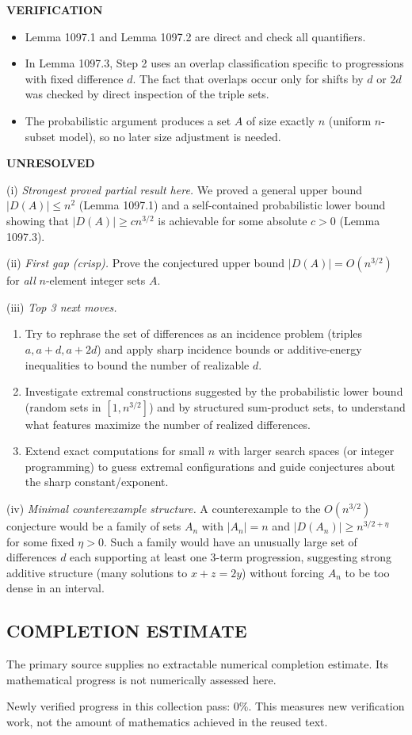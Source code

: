 \medskip
\noindent\textbf{VERIFICATION}

\smallskip
\noindent
\begin{itemize}
\item Lemma 1097.1 and Lemma 1097.2 are direct and check all quantifiers.
\item In Lemma 1097.3, Step 2 uses an overlap classification specific to progressions with fixed difference $d$. The fact that overlaps occur only for shifts by $d$ or $2d$ was checked by direct inspection of the triple sets.
\item The probabilistic argument produces a set $A$ of size exactly $n$ (uniform $n$-subset model), so no later size adjustment is needed.
\end{itemize}

\medskip
\noindent\textbf{UNRESOLVED}

\smallskip
\noindent
(i) \emph{Strongest proved partial result here.}
We proved a general upper bound $|D(A)|\le n^2$ (Lemma 1097.1) and a self-contained probabilistic lower bound showing that $|D(A)|\ge c n^{3/2}$ is achievable for some absolute $c>0$ (Lemma 1097.3).

\smallskip
\noindent
(ii) \emph{First gap (crisp).}
Prove the conjectured upper bound $|D(A)|=O(n^{3/2})$ for \emph{all} $n$-element integer sets $A$.

\smallskip
\noindent
(iii) \emph{Top 3 next moves.}
\begin{enumerate}
\item Try to rephrase the set of differences as an incidence problem (triples $a,a+d,a+2d$) and apply sharp incidence bounds or additive-energy inequalities to bound the number of realizable $d$.
\item Investigate extremal constructions suggested by the probabilistic lower bound (random sets in $[1,n^{3/2}]$) and by structured sum-product sets, to understand what features maximize the number of realized differences.
\item Extend exact computations for small $n$ with larger search spaces (or integer programming) to guess extremal configurations and guide conjectures about the sharp constant/exponent.
\end{enumerate}

\smallskip
\noindent
(iv) \emph{Minimal counterexample structure.}
A counterexample to the $O(n^{3/2})$ conjecture would be a family of sets $A_n$ with $|A_n|=n$ and $|D(A_n)|\ge n^{3/2+\eta}$ for some fixed $\eta>0$. Such a family would have an unusually large set of differences $d$ each supporting at least one 3-term progression, suggesting strong additive structure (many solutions to $x+z=2y$) without forcing $A_n$ to be too dense in an interval.



\subsection*{COMPLETION ESTIMATE}
The primary source supplies no extractable numerical completion estimate. Its mathematical progress is not numerically assessed here.

Newly verified progress in this collection pass: $0\%$. This measures new verification work, not the amount of mathematics achieved in the reused text.
